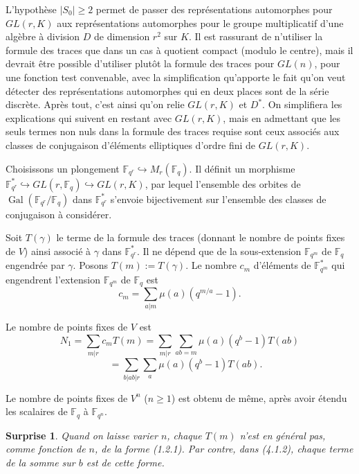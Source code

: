\documentclass[11pt,a4paper]{article}
\theoremstyle{plain}
\newtheorem{surprise}[theorem]{Surprise}
\theoremstyle{definition}
\DeclareMathOperator{\Gal}{Gal}
\newcommand{\F}{\mathbb{F}}
\begin{document}
L'hypoth\`ese $|S_0| \geq 2$ permet de passer des repr\'esentations automorphes pour $GL(r, K)$ aux repr\'esentations automorphes pour le groupe multiplicatif d'une alg\`ebre \`a division $D$ de dimension $r^2$ sur $K$. Il est rassurant de n'utiliser la formule des traces que dans un cas \`a quotient compact (modulo le centre), mais il devrait \^etre possible d'utiliser plut\^ot la formule des traces pour $GL(n)$, pour une fonction test convenable, avec la simplification qu'apporte le fait qu'on veut d\'etecter des repr\'esentations automorphes qui en deux places sont de la s\'erie discr\`ete. Apr\`es tout, c'est ainsi qu'on relie $GL(r, K)$ et $D^*$. On simplifiera les explications qui suivent en restant avec $GL(r, K)$, mais en admettant que les seuls termes non nuls dans la formule des traces requise sont ceux associ\'es aux classes de conjugaison d'\'el\'ements elliptiques d'ordre fini de $GL(r, K)$.

Choisissons un plongement $\F_{q^r} \hookrightarrow M_r(\F_q)$. Il d\'efinit un morphisme $\F_{q^r}^* \hookrightarrow GL(r, \F_q) \hookrightarrow GL(r, K)$, par lequel l'ensemble des orbites de $\Gal(\F_{q^r}/\F_q)$ dans $\F_{q^r}^*$ s'envoie bijectivement sur l'ensemble des classes de conjugaison \`a consid\'erer.

Soit $T(\gamma)$ le terme de la formule des traces (donnant le nombre de points fixes de $V$) ainsi associ\'e \`a $\gamma$ dans $\F_{q^r}^*$. Il ne d\'epend que de la sous-extension $\F_{q^m}$ de $\F_q$ engendr\'ee par $\gamma$. Posons $T(m) := T(\gamma)$. Le nombre $c_m$ d'\'el\'ements de $\F_{q^m}^*$ qui engendrent l'extension $\F_{q^m}$ de $\F_q$ est
\[
c_m = \sum_{a|m} \mu(a)(q^{m/a} - 1).
\]

Le nombre de points fixes de $V$ est
\begin{equation}
N_1 = \sum_{m|r} c_m T(m) = \sum_{m|r} \sum_{ab=m} \mu(a)(q^b - 1) T(ab)
\tag{4.1.2}
\end{equation}
\[
\phantom{N_1} = \sum_{b|ab|r} \sum_{a} \mu(a)(q^b - 1) T(ab).
\]

Le nombre de points fixes de $V^n$ ($n \geq 1$) est obtenu de m\^eme, apr\`es avoir \'etendu les scalaires de $\F_q$ \`a $\F_{q^n}$.

\begin{surprise}
Quand on laisse varier $n$, chaque $T(m)$ n'est en g\'en\'eral pas, comme fonction de $n$, de la forme (1.2.1). Par contre, dans (4.1.2), chaque terme de la somme sur $b$ est de cette forme.
\end{surprise}
\end{document}
